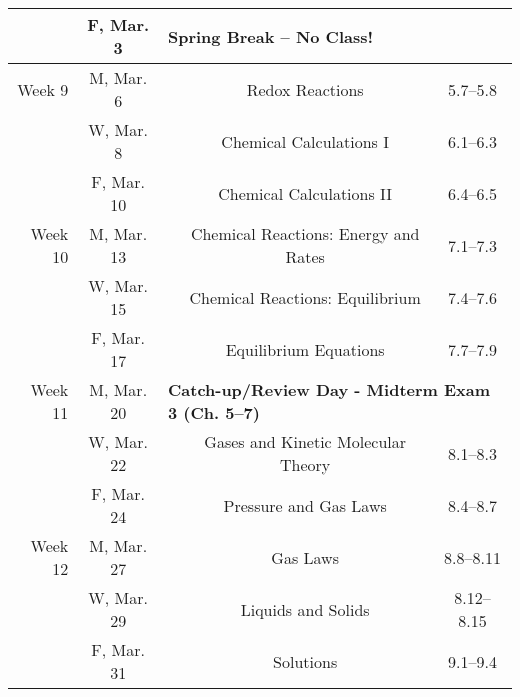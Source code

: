 \documentclass[12pt, letterpaper]{article}
\begin{document}
\begin{tabular}{rcccc}
	       & F, Mar. 3  & \multicolumn{3}{l}{\textbf{Spring Break -- No Class!}}                                                                                          \\
	\midrule
	Week 9      & M, Mar. 6  &                                                                                & Redox Reactions                      & 5.7--5.8     \\
	            & W, Mar. 8  &                                                                                & Chemical Calculations I              & 6.1--6.3     \\
	            & F, Mar. 10 &                                                                                & Chemical Calculations II             & 6.4--6.5     \\
	\midrule
	Week 10     & M, Mar. 13 &                                                                                & Chemical Reactions: Energy and Rates & 7.1--7.3     \\
	            & W, Mar. 15 &                                                                                & Chemical Reactions: Equilibrium      & 7.4--7.6     \\
	            & F, Mar. 17 &                                                                                & Equilibrium Equations                & 7.7--7.9     \\
	\midrule
	Week 11     & M, Mar. 20 & \multicolumn{3}{l}{\textbf{Catch-up/Review Day - Midterm Exam 3 (Ch. 5--7)}}                                                         \\
	            & W, Mar. 22 &                                                                                & Gases and Kinetic Molecular Theory   & 8.1--8.3     \\
	            & F, Mar. 24 &                                                                                & Pressure and Gas Laws                & 8.4--8.7     \\
	\midrule
	Week 12     & M, Mar. 27 &                                                                                & Gas Laws                             & 8.8--8.11    \\
	            & W, Mar. 29 &                                                                                & Liquids and Solids                   & 8.12--8.15   \\
	            & F, Mar. 31 &                                                                                & Solutions                            & 9.1--9.4     \\
\end{tabular}
\end{document}
